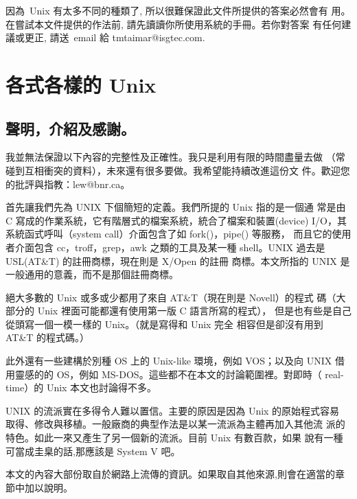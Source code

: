 \documentclass{article}
\begin{document}
\begin{CJK*}{Bg5}{ming}
因為~Unix 有太多不同的種類了, 所以很難保證此文件所提供的答案必然會有
用。在嘗試本文件提供的作法前, 請先讀讀你所使用系統的手冊。若你對答案
有任何建議或更正, 請送~email 給 tmtaimar@isgtec.com.

\setcounter{section}{5}
\section{各式各樣的 Unix}
\subsection{聲明，介紹及感謝。}

    我並無法保證以下內容的完整性及正確性。我只是利用有限的時間盡量去做
    （常碰到互相衝突的資料），未來還有很多要做。我希望能持續改進這份文
    件。歡迎您的批評與指教：lew@bnr.ca。
    
    首先讓我們先為 UNIX 下個簡短的定義。我們所提的 Unix 指的是一個通
    常是由 C 寫成的作業系統，它有階層式的檔案系統，統合了檔案和裝置(device)
    I/O，其系統函式呼叫（system call）介面包含了如 fork()，pipe() 等服務，
    而且它的使用者介面包含 cc，troff，grep，awk 之類的工具及某一種
    shell。UNIX 過去是 USL(AT\&T) 的註冊商標，現在則是 X/Open 的註冊
    商標。本文所指的 UNIX 是一般通用的意義，而不是那個註冊商標。
    
    絕大多數的 Unix 或多或少都用了來自 AT\&T（現在則是 Novell）的程式
    碼（大部分的 Unix 裡面可能都還有使用第一版 C 語言所寫的程式），
    但是也有些是自己從頭寫一個一模一樣的 Unix。（就是寫得和 Unix 完全
    相容但是卻沒有用到 AT\&T 的程式碼。）
    
    此外還有一些建構於別種 OS 上的 Unix-like 環境，例如 VOS；以及向 UNIX
    借用靈感的的 OS，例如 MS-DOS。這些都不在本文的討論範圍裡。對即時（
    real-time）的 Unix 本文也討論得不多。
    
    UNIX 的流派實在多得令人難以置信。主要的原因是因為 Unix 的原始程式容易
    取得、修改與移植。一般廠商的典型作法是以某一流派為主體再加入其他流
    派的特色。如此一來又產生了另一個新的流派。目前 Unix 有數百款，如果
    說有一種可當成圭臬的話,那應該是 System V 吧。
    
    本文的內容大部份取自於網路上流傳的資訊。如果取自其他來源,則會在適當的章
    節中加以說明。
   

\end{CJK*}
\end{document}
